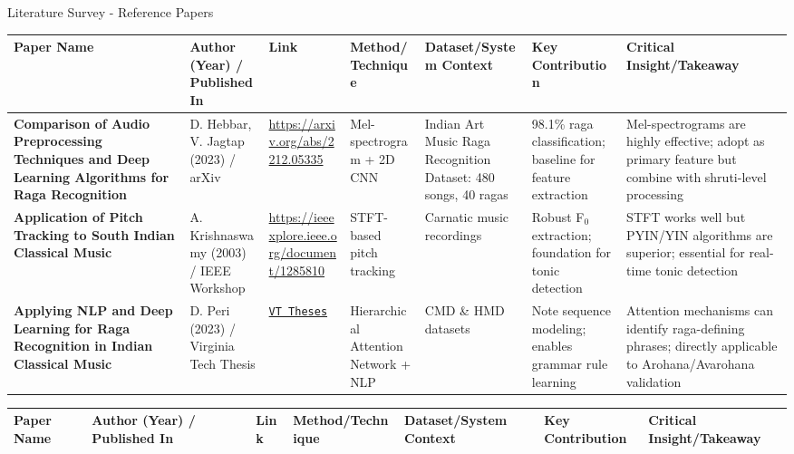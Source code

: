 \documentclass[aspectratio=169,11pt]{beamer}
\begin{document}
	\begin{frame}[allowframebreaks]{Literature Survey - Reference Papers}
		
		{\tiny
			\begin{longtable}{p{1.6cm}|p{1.3cm}|p{1.5cm}|p{1.6cm}|p{1.6cm}|p{1.6cm}|p{1.8cm}}
				\toprule
				\textbf{Paper Name} & \textbf{Author (Year) / Published In} & \textbf{Link} & \textbf{Method/Technique} & \textbf{Dataset/System Context} & \textbf{Key Contribution} & \textbf{Critical Insight/Takeaway} \\
				\midrule
				
				\textbf{Comparison of Audio Preprocessing Techniques and Deep Learning Algorithms for Raga Recognition} & D. Hebbar, V. Jagtap (2023) / arXiv & \url{https://arxiv.org/abs/2212.05335} & Mel-spectrogram + 2D CNN & Indian Art Music Raga Recognition Dataset: 480 songs, 40 ragas & 98.1\% raga classification; baseline for feature extraction & Mel-spectrograms are highly effective; adopt as primary feature but combine with shruti-level processing \\
				\addlinespace
				
				\textbf{Application of Pitch Tracking to South Indian Classical Music} & A. Krishnaswamy (2003) / IEEE Workshop & \url{https://ieeexplore.ieee.org/document/1285810} & STFT-based pitch tracking & Carnatic music recordings & Robust F$_0$ extraction; foundation for tonic detection & STFT works well but PYIN/YIN algorithms are superior; essential for real-time tonic detection \\
				\addlinespace
				
				\textbf{Applying NLP and Deep Learning for Raga Recognition in Indian Classical Music} & D. Peri (2023) / Virginia Tech Thesis & \href{https://vtechworks.lib.vt.edu/items/bc2e1f76-139a-4200-a419-0cf3b87a7b96}{\texttt{VT\ Theses}} & Hierarchical Attention Network + NLP & CMD \& HMD datasets & Note sequence modeling; enables grammar rule learning & Attention mechanisms can identify raga-defining phrases; directly applicable to Arohana/Avarohana validation \\
				\bottomrule
			\end{longtable}
		}
		
		\framebreak
		
		{\tiny
			\begin{longtable}{p{1.6cm}|p{1.3cm}|p{1.5cm}|p{1.6cm}|p{1.6cm}|p{1.6cm}|p{1.8cm}}
				\toprule
				\textbf{Paper Name} & \textbf{Author (Year) / Published In} & \textbf{Link} & \textbf{Method/Technique} & \textbf{Dataset/System Context} & \textbf{Key Contribution} & \textbf{Critical Insight/Takeaway} \\
				\midrule
				

\end{longtable}}
\end{frame}
\end{document}
